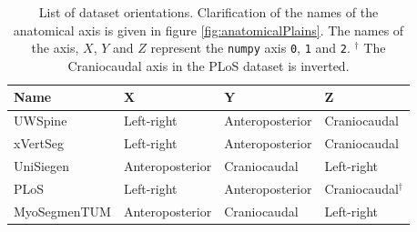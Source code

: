 \begin{table}
 
    \begin{tabular}{ l l l l} 
     \toprule
     Name & X & Y & Z \\
     \hline 
    UWSpine & Left-right & Anteroposterior & Craniocaudal \\
    xVertSeg & Left-right & Anteroposterior & Craniocaudal \\
    UniSiegen  &  Anteroposterior & Craniocaudal & Left-right \\
    PLoS & Left-right & Anteroposterior & Craniocaudal$^\dagger$ \\
    MyoSegmenTUM &  Anteroposterior & Craniocaudal & Left-right \\
     \bottomrule
    \end{tabular}
    \caption{List of dataset orientations. Clarification of the names of the anatomical axis is given in figure \ref{fig:anatomicalPlains}.
    The names of the axis, $X$, $Y$ and $Z$ represent the \texttt{numpy} axis \texttt{0}, \texttt{1} and \texttt{2}.
    $^\dagger$ The Craniocaudal axis in the PLoS dataset is inverted.\label{tab:dataOrientation}
    }
\end{table}
